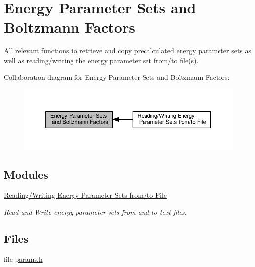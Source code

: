 \hypertarget{group__energy__parameters}{}\section{Energy Parameter Sets and Boltzmann Factors}
\label{group__energy__parameters}


All relevant functions to retrieve and copy precalculated energy parameter sets as well as reading/writing the energy parameter set from/to file(s).  


Collaboration diagram for Energy Parameter Sets and Boltzmann Factors\+:
\nopagebreak
\begin{figure}[H]
\begin{center}
\leavevmode
\includegraphics[width=350pt]{group__energy__parameters}
\end{center}
\end{figure}
\subsection*{Modules}
\begin{DoxyCompactItemize}
\item 
\hyperlink{group__energy__parameters__rw}{Reading/\+Writing Energy Parameter Sets from/to File}
\begin{DoxyCompactList}\small\item\em Read and Write energy parameter sets from and to text files. \end{DoxyCompactList}\end{DoxyCompactItemize}
\subsection*{Files}
\begin{DoxyCompactItemize}
\item 
file \hyperlink{params_8h}{params.\+h}
\end{DoxyCompactItemize}
